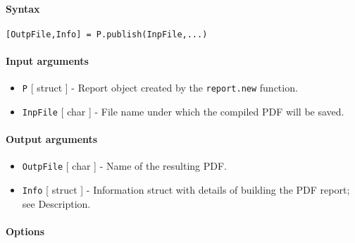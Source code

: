 


	\paragraph{Syntax}\label{syntax}

\begin{verbatim}
[OutpFile,Info] = P.publish(InpFile,...)
\end{verbatim}

\paragraph{Input arguments}\label{input-arguments}

\begin{itemize}
\item
  \texttt{P} {[} struct {]} - Report object created by the
  \texttt{report.new} function.
\item
  \texttt{InpFile} {[} char {]} - File name under which the compiled PDF
  will be saved.
\end{itemize}

\paragraph{Output arguments}\label{output-arguments}

\begin{itemize}
\item
  \texttt{OutpFile} {[} char {]} - Name of the resulting PDF.
\item
  \texttt{Info} {[} struct {]} - Information struct with details of
  building the PDF report; see Description.
\end{itemize}

\paragraph{Options}\label{options}

